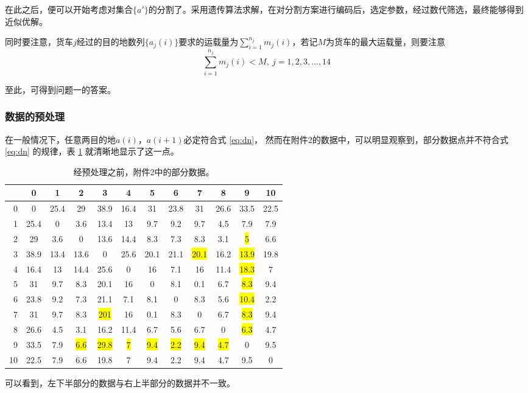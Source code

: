 \documentclass[UTF8,cs4size]{ctexart}
\begin{document}
在此之后，便可以开始考虑对集合$\{a'\}$的分割了。采用遗传算法求解，在对分割方案进行编码后，选定参数，经过数代筛选，最终能够得到近似优解。

同时要注意，货车$j$经过的目的地数列$\{a_j(i)\}$要求的运载量为$\sum_{i=1}^{n_j} m_j(i)$，若记$M$为货车的最大运载量，则要注意
\begin{equation} \label{eq:good}
   \sum_{i=1}^{n_j} m_j(i) < M,\ j=1,2,3,\ldots,14
\end{equation}

至此，可得到问题一的答案。
\subsubsection{数据的预处理}
在一般情况下，任意两目的地$a(i)$，$a(i+1)$必定符合式 \ref{eq:dn}，
然而在附件2的数据中，可以明显观察到，部分数据点并不符合式 \ref{eq:dn} 的规律，表 \ref{fig-bef} 就清晰地显示了这一点。

\begin{table}[!p]
\centering
  \begin{tabular}{r|ccccccccccc}
    & 0 & 1 & 2 & 3 & 4 & 5 & 6 & 7 & 8 & 9 & 10 \\
    \hline
    0 & 0 & 25.4 & 29 & 38.9 & 16.4 & 31 & 23.8 & 31 & 26.6 & 33.5 & 22.5 \\
    1 & 25.4 & 0 & 3.6 & 13.4 & 13 & 9.7 & 9.2 & 9.7 & 4.5 & 7.9 & 7.9 \\
    2 & 29 & 3.6 & 0 & 13.6 & 14.4 & 8.3 & 7.3 & 8.3 & 3.1 & \colorbox{yellow}{5} & 6.6 \\
    3 & 38.9 & 13.4 & 13.6 & 0 & 25.6 & 20.1 & 21.1 & \colorbox{yellow}{20.1} & 16.2 & \colorbox{yellow}{13.9} & 19.8 \\
    4 & 16.4 & 13 & 14.4 & 25.6 & 0 & 16 & 7.1 & 16 & 11.4 & \colorbox{yellow}{18.3} & 7 \\
    5 & 31 & 9.7 & 8.3 & 20.1 & 16 & 0 & 8.1 & 0.1 & 6.7 & \colorbox{yellow}{8.3} & 9.4  \\
    6 & 23.8 & 9.2 & 7.3 & 21.1 & 7.1 & 8.1 & 0 & 8.3 & 5.6 & \colorbox{yellow}{10.4} & 2.2 \\
    7 & 31 & 9.7 & 8.3 & \colorbox{yellow}{201} & 16 & 0.1 & 8.3 & 0 & 6.7 & \colorbox{yellow}{8.3} & 9.4 \\
    8 & 26.6 & 4.5 & 3.1 & 16.2 & 11.4 & 6.7 & 5.6 & 6.7 & 0 & \colorbox{yellow}{6.3} & 4.7 \\
    9 & 33.5 & 7.9 & \colorbox{yellow}{6.6} & \colorbox{yellow}{29.8} & \colorbox{yellow}{7} & \colorbox{yellow}{9.4} & \colorbox{yellow}{2.2} & \colorbox{yellow}{9.4} & \colorbox{yellow}{4.7} & 0 & 9.5 \\
    10 & 22.5 & 7.9 & 6.6 & 19.8 & 7 & 9.4 & 2.2 & 9.4 & 4.7 & 9.5 & 0 \\
  \end{tabular}
  \caption{经预处理之前，附件2中的部分数据。}\label{fig-bef}
  可以看到，左下半部分的数据与右上半部分的数据并不一致。
\end{table}
\end{document}
